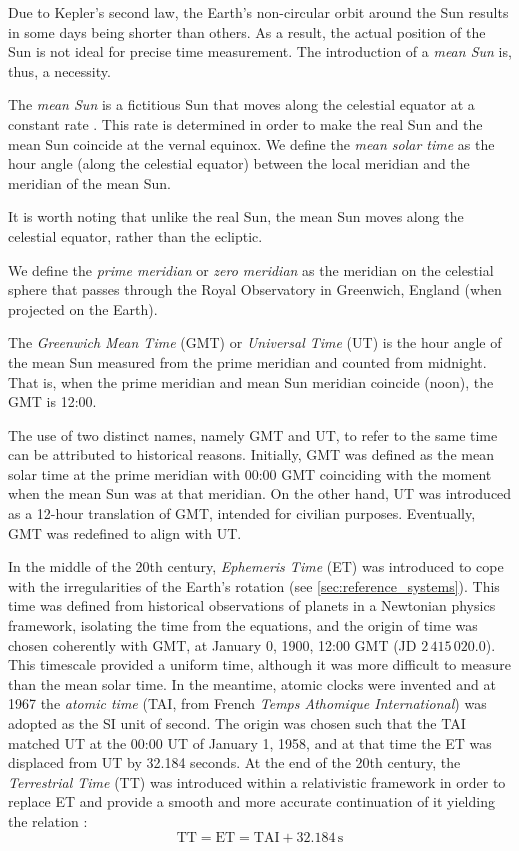 \documentclass[../main.tex]{subfiles}
\begin{document}
Due to Kepler's second law, the Earth's non-circular orbit around the Sun results in some days being shorter than others. As a result, the actual position of the Sun is not ideal for precise time measurement. The introduction of a \emph{mean Sun} is, thus, a necessity.

\begin{definition}
  The \emph{mean Sun} is a fictitious Sun that moves along the celestial equator at a constant rate \cite{vallado}. This rate is determined in order to make the real Sun and the mean Sun coincide at the vernal equinox. We define the \emph{mean solar time} as the hour angle (along the celestial equator) between the local meridian and the meridian of the mean Sun.
\end{definition}
It is worth noting that unlike the real Sun, the mean Sun moves along the celestial equator, rather than the ecliptic.
\begin{definition}
  We define the \emph{prime meridian} or \emph{zero meridian} as the meridian on the celestial sphere that passes through the Royal Observatory in Greenwich, England (when projected on the Earth).
\end{definition}
\begin{definition}
  The \emph{Greenwich Mean Time} (GMT) or \emph{Universal Time} (UT) is the hour angle of the mean Sun measured from the prime meridian and counted from midnight. That is, when the prime meridian and mean Sun meridian coincide (noon), the GMT is 12:00.
\end{definition}
The use of two distinct names, namely GMT and UT, to refer to the same time can be attributed to historical reasons. Initially, GMT was defined as the mean solar time at the prime meridian with 00:00 GMT coinciding with the moment when the mean Sun was at that meridian. On the other hand, UT was introduced as a 12-hour translation of GMT, intended for civilian purposes. Eventually, GMT was redefined to align with UT.

In the middle of the 20th century, \emph{Ephemeris Time} (ET) was introduced to cope with the irregularities of the Earth's rotation (see \cref{sec:reference_systems}). This time was defined from historical observations of planets in a Newtonian physics framework, isolating the time from the equations, and the origin of time was chosen coherently with GMT, at January 0, 1900, 12:00 GMT (JD $2\,415\,020.0$). This timescale provided a uniform time, although it was more difficult to measure than the mean solar time. In the meantime, atomic clocks were invented and at 1967 the \emph{atomic time} (TAI, from French \emph{Temps Athomique International}) was adopted as the SI unit of second. The origin was chosen such that the TAI matched UT at the 00:00 UT of January 1, 1958, and at that time the ET was displaced from UT by 32.184 seconds. At the end of the 20th century, the \emph{Terrestrial Time} (TT) was introduced within a relativistic framework in order to replace ET and provide a smooth and more accurate continuation of it yielding the relation \cite{montenbruck}:
\begin{equation}
  \text{TT}=\text{ET}= \text{TAI} + 32.184\,\mathrm{s}
\end{equation}
\end{document}
